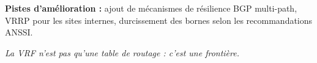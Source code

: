 \documentclass[11pt,a4paper]{article}
\begin{document}
\medskip
\textbf{Pistes d'amélioration :} ajout de mécanismes de résilience BGP multi-path, VRRP pour les sites internes, durcissement des bornes selon les recommandations ANSSI.

\vspace{0.5cm}
\begin{center}
{\sffamily\itshape\color{midgray}\large
\og La VRF n'est pas qu'une table de routage : c'est une frontière. \fg{}}
\end{center}
\end{document}
